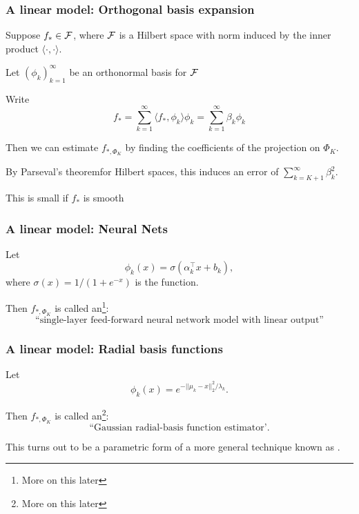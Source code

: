 \documentclass{beamer}
\begin{document}
\begin{frame}
\frametitle{A linear model: Orthogonal basis expansion}
Suppose $f_* \in \mathcal{F}$, where $\mathcal{F}$ is a Hilbert space with norm induced by the inner product $\langle \cdot, \cdot \rangle$. 
\vsp

Let $(\phi_k)_{k=1}^\infty$ be an orthonormal basis for $\mathcal{F}$

\vsp
Write 
\[
 f_* = \sum_{k=1}^\infty \langle f_*, \phi_k \rangle \phi_k =  \sum_{k=1}^\infty \beta_k \phi_k
\]

\vsp
Then we can estimate $f_{*,\Phi_K}$ by finding the coefficients of the projection on $\Phi_K$.  
\vsp

By Parseval's theorem\Note for Hilbert spaces\note, this induces an  error of $\sum_{k=K+1}^{\infty} \beta_k^2$.

\vsp
This is small if $f_*$ is smooth 

\end{frame}

\begin{frame}
\frametitle{A linear model: Neural Nets}
Let 
\[
\phi_k(x)  = \sigma(\alpha_k^{\top}x + b_k),
\]
where $\sigma(x) = 1/(1 + e^{-x})$ is the  function.
\vsp

Then $f_{*,\Phi_K}$ is called an\footnote{More on this later}:
\[
\textrm{``single-layer feed-forward neural network model with linear output''} 
\]
\end{frame}

\begin{frame}
\frametitle{A linear model: Radial basis functions}
Let 
\[
\phi_k(x)  = e^{-||\mu_k - x||_2^2/\lambda_k}.
\]

Then $f_{*,\Phi_K}$ is called an\footnote{More on this later}:
\[
\textrm{``Gaussian radial-basis function estimator'}.
\]

This turns out to be a parametric form of a more general technique known as .
\end{frame}
\end{document}

